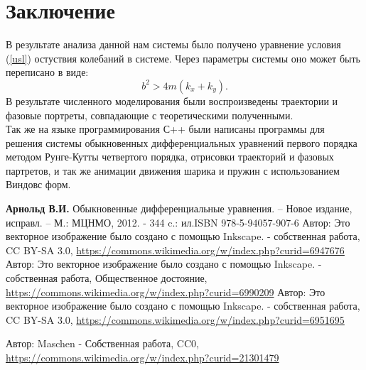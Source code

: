 \documentclass[a4paper,12pt,titlepage]{article}
\theoremstyle{definition}
\theoremstyle{theorem}
\theoremstyle{definition}
\begin{document}
\newpage
\section{Заключение}
В результате анализа данной нам системы было получено уравнение условия (\ref*{usl}) остуствия 
колебаний в системе. Через параметры системы оно может быть переписано в виде:
\begin{equation}
    b^2 > 4m(k_x + k_y).
\end{equation}
В результате численного моделирования были воспроизведены траектории 
и фазовые портреты, совпадающие с теоретическими полученными.\\
Так же на языке программирования С++ 
были написаны программы для решения системы обыкновенных дифференциальных 
уравнений первого порядка методом Рунге-Кутты четвертого порядка, отрисовки траекторий и фазовых партретов, 
и так же анимации движения шарика и пружин с использованием Виндовс форм.
 \newpage
\begin{thebibliography}{99}

    {\bf Арнольд В.И.} Обыкновенные дифференциальные уравнения. – Новое издание, исправл. – М.: МЦНМО, 2012. - 344 c.: 
    ил.ISBN 978-5-94057-907-6 
    Автор: Это векторное изображение было создано с помощью Inkscape. 
    - собственная работа, CC BY-SA 3.0, 
    \url{https://commons.wikimedia.org/w/index.php?curid=6947676}
    Автор: Это векторное изображение было создано с помощью Inkscape. 
    - собственная работа, Общественное достояние, 
    \url{https://commons.wikimedia.org/w/index.php?curid=6990209}
    Автор: Это векторное изображение было создано с помощью Inkscape. 
    - собственная работа, CC BY-SA 3.0, 
    \url{https://commons.wikimedia.org/w/index.php?curid=6951695}

    Автор: Maschen - Собственная работа, CC0, 
    \url{https://commons.wikimedia.org/w/index.php?curid=21301479}
    

    

\end{thebibliography}
\end{document}
